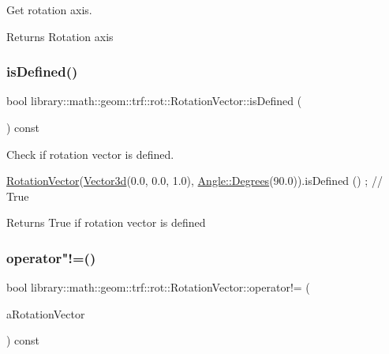 Get rotation axis. 

\begin{DoxyReturn}{Returns}
Rotation axis 
\end{DoxyReturn}
\mbox{\label{classlibrary_1_1math_1_1geom_1_1trf_1_1rot_1_1_rotation_vector_a4123de2991fa1f5df0745a1e6b87d959}} 
\subsubsection{\texorpdfstring{is\+Defined()}{isDefined()}}
{\footnotesize\ttfamily bool library\+::math\+::geom\+::trf\+::rot\+::\+Rotation\+Vector\+::is\+Defined (\begin{DoxyParamCaption}{ }\end{DoxyParamCaption}) const}



Check if rotation vector is defined. 


\begin{DoxyCode}
\hyperlink{classlibrary_1_1math_1_1geom_1_1trf_1_1rot_1_1_rotation_vector_a32b1fab5e81bc24d777324daf5849205}{RotationVector}(\hyperlink{namespacelibrary_1_1math_1_1obj_a977e84e9bf317a4e7dd9d6d671d6da2f}{Vector3d}(0.0, 0.0, 1.0), \hyperlink{classlibrary_1_1math_1_1geom_1_1_angle_a64aa53e8420aeb6f671d86c65c370bc8}{Angle::Degrees}(90.0)).isDefined
      () ; \textcolor{comment}{// True}
\end{DoxyCode}


\begin{DoxyReturn}{Returns}
True if rotation vector is defined 
\end{DoxyReturn}
\mbox{\label{classlibrary_1_1math_1_1geom_1_1trf_1_1rot_1_1_rotation_vector_a2fdd75f9cf902bad02ba57b85e754490}} 
\subsubsection{\texorpdfstring{operator"!=()}{operator!=()}}
{\footnotesize\ttfamily bool library\+::math\+::geom\+::trf\+::rot\+::\+Rotation\+Vector\+::operator!= (\begin{DoxyParamCaption}\item[{const \hyperlink{classlibrary_1_1math_1_1geom_1_1trf_1_1rot_1_1_rotation_vector}{Rotation\+Vector} \&}]{a\+Rotation\+Vector }\end{DoxyParamCaption}) const}



